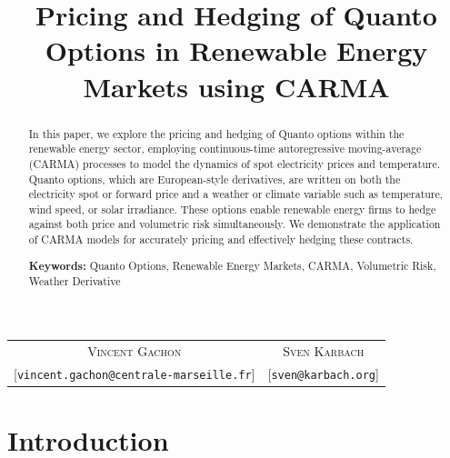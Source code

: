 \documentclass[10pt,a4paper,reqno]{amsart}
\theoremstyle{example}
\begin{document}
\title[Pricing and Hedging Quantos using CARMA]{Pricing and Hedging of Quanto Options in Renewable Energy Markets using CARMA}

\address{\today{}, Informatics Institute and Korteweg-de Vries Institute for Mathematics at the University of
  Amsterdam, Science Park 105-107, 1098 XG Amsterdam, Netherlands}     

\maketitle
\vspace{-0mm}
\begin{center}
  \begin{tabular}{cc}
    \textsc{Vincent Gachon} & \textsc{Sven Karbach} \\
    \small[\texttt{\MakeLowercase{vincent.gachon@centrale-marseille.fr}}] &  \small[\texttt{\MakeLowercase{sven@karbach.org}}] \\
  \end{tabular}
\end{center}


\begin{abstract}
In this paper, we explore the pricing and hedging of Quanto options within the renewable energy sector, employing continuous-time autoregressive moving-average (CARMA) processes to model the dynamics of spot electricity prices and temperature. Quanto options, which are European-style derivatives, are written on both the electricity spot or forward price and a weather or climate variable such as temperature, wind speed, or solar irradiance. These options enable renewable energy firms to hedge against both price and volumetric risk simultaneously. We demonstrate the application of CARMA models for accurately pricing and effectively hedging these contracts.\newline
  
\noindent \textbf{Keywords:} Quanto Options, Renewable Energy Markets, CARMA, Volumetric Risk, Weather Derivative
\end{abstract}

\maketitle

\section{Introduction}
\end{document}
